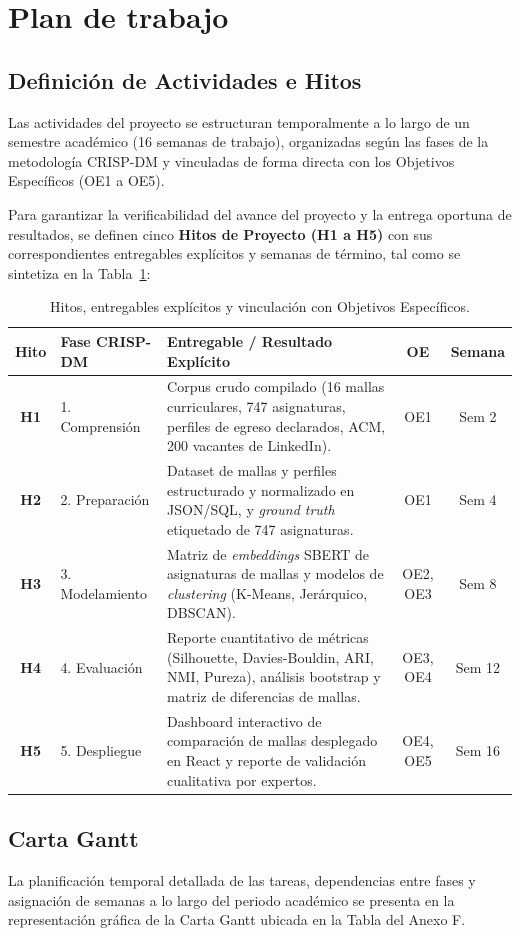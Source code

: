 \section{Plan de trabajo}
\label{cap:Schedule}

\subsection{Definición de Actividades e Hitos}
\label{sec:activities_milestones}

Las actividades del proyecto se estructuran temporalmente a lo largo de un semestre académico (16 semanas de trabajo), organizadas según las fases de la metodología CRISP-DM y vinculadas de forma directa con los Objetivos Específicos (OE1 a OE5).

Para garantizar la verificabilidad del avance del proyecto y la entrega oportuna de resultados, se definen cinco \textbf{Hitos de Proyecto (H1 a H5)} con sus correspondientes entregables explícitos y semanas de término, tal como se sintetiza en la Tabla~\ref{tab:hitos_planification}:

\vspace{0.3cm}

\begin{table}[H]
	\centering
	\small
	\renewcommand{\baselinestretch}{1.0}\selectfont
	\caption{Hitos, entregables explícitos y vinculación con Objetivos Específicos.}
	\label{tab:hitos_planification}
	\captionsetup{skip=6pt}
	\begin{tabularx}{\textwidth}{c p{3.2cm} X c c}
		\toprule
		\textbf{Hito} & \textbf{Fase CRISP-DM} & \textbf{Entregable / Resultado Explícito} & \textbf{OE} & \textbf{Semana} \\
		\midrule
		\textbf{H1} & 1. Comprensión & Corpus crudo compilado (16 mallas curriculares, 747 asignaturas, perfiles de egreso declarados, ACM, 200 vacantes de LinkedIn). & OE1 & Sem 2 \\
		\textbf{H2} & 2. Preparación & Dataset de mallas y perfiles estructurado y normalizado en JSON/SQL, y \textit{ground truth} etiquetado de 747 asignaturas. & OE1 & Sem 4 \\
		\textbf{H3} & 3. Modelamiento & Matriz de \textit{embeddings} SBERT de asignaturas de mallas y modelos de \textit{clustering} (K-Means, Jerárquico, DBSCAN). & OE2, OE3 & Sem 8 \\
		\textbf{H4} & 4. Evaluación & Reporte cuantitativo de métricas (Silhouette, Davies-Bouldin, ARI, NMI, Pureza), análisis bootstrap y matriz de diferencias de mallas. & OE3, OE4 & Sem 12 \\
		\textbf{H5} & 5. Despliegue & Dashboard interactivo de comparación de mallas desplegado en React y reporte de validación cualitativa por expertos. & OE4, OE5 & Sem 16 \\
		\bottomrule
	\end{tabularx}
\end{table}

\vspace{0.3cm}

\subsection{Carta Gantt}
\label{sec:gantt_chart}

La planificación temporal detallada de las tareas, dependencias entre fases y asignación de semanas a lo largo del periodo académico se presenta en la representación gráfica de la Carta Gantt ubicada en la Tabla del Anexo F.
